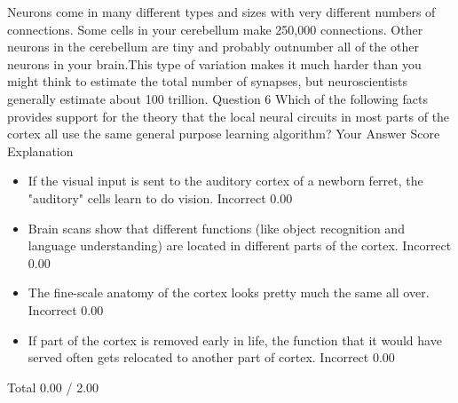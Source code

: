 Neurons come in many different types and sizes with very different numbers of connections. Some cells in your cerebellum make 250,000 connections. Other neurons in the cerebellum are tiny and probably outnumber all of the other neurons in your brain.This type of variation makes it much harder than you might think to estimate the total number of synapses, but neuroscientists generally estimate about 100 trillion.
Question 6
Which of the following facts provides support for the theory that the local neural circuits in most parts of the cortex all use the same general purpose learning algorithm?
Your Answer		Score	Explanation
\begin{itemize}
\item If the visual input is sent to the auditory cortex of a newborn ferret, the "auditory" cells learn to do vision.	Incorrect	0.00	
\item Brain scans show that different functions (like object recognition and language understanding) are located in different parts of the cortex.	Incorrect	0.00	
\item The fine-scale anatomy of the cortex looks pretty much the same all over.	Incorrect	0.00	
\item If part of the cortex is removed early in life, the function that it would have served often gets relocated to another part of cortex.	Incorrect	0.00	
\end{itemize}
Total		0.00 / 2.00	
